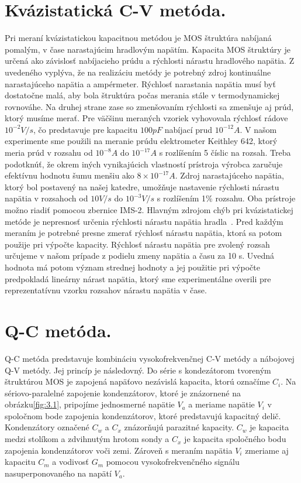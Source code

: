 \section{Kvázistatická C-V metóda.}\label{sec:3.2}

Pri meraní kvázistatickou kapacitnou metódou je MOS štruktúra nabíjaná
pomalým, v čase narastajúcim hradlovým napätím. Kapacita MOS štruktúry
je určená ako závislosť nabíjacieho prúdu a rýchlosti nárastu
hradlového napätia.  Z uvedeného vyplýva, že na realizáciu metódy je
potrebný zdroj kontinuálne narastajúceho napätia a
ampérmeter. Rýchlosť narastania napätia musí byť dostatočne malá, aby
bola štruktúra počas merania stále v termodynamickej rovnováhe. Na
druhej strane zase so zmenšovaním rýchlosti sa zmenšuje aj prúd, ktorý
musíme merať. Pre väčšinu meraných vzoriek vyhovovala rýchlosť rádove
$10^{-2}V/s$, čo predstavuje pre kapacitu $100pF$ nabíjací prud
$10^{-12}A$. V našom experimente sme použili na meranie prúdu
elektrometer Keithley 642, ktorý meria prúd v rozsahu od $10^{-8}A$ do
$10^{-17}A$ s rozlíšením 5 číslic na rozsah.  Treba podotknúť, že
okrem iných vynikajúcich vlastností prístroja výrobca zaručuje
efektívnu hodnotu šumu menšiu ako $8\times10^{-17}A$. Zdroj
narastajúceho napätia, ktorý bol postavený na našej katedre, umožňuje
nastavenie rýchlosti nárastu napätia v rozsahoch od $10V/s$ do
$10^{-3}V/s$ s rozlíšením 1\% rozsahu. Oba prístroje možno riadiť
pomocou zbernice IMS-2.  Hlavným zdrojom chýb pri kvázistatickej
metóde je nepresnosť určenia rýchlosti nárastu napätia
hradla~\cite{1.5}. Pred každým meraním je potrebné presne zmerať
rýchlosť nárastu napätia, ktorá sa potom použije pri výpočte
kapacity. Rýchlosť nárastu napätia pre zvolený rozsah určujeme v našom
prípade z podielu zmeny napätia a času za 10 s.  Uvedná hodnota má
potom význam strednej hodnoty a jej použitie pri výpočte predpokladá
lineárny nárast napätia, ktorý sme experimentálne overili pre
reprezentatívnu vzorku rozsahov nárastu napätia v čase.

\section{Q-C metóda.}\label{sec:3.3}

Q-C metóda\cite{3.4} predstavuje kombináciu vysokofrekvenčnej C-V
metódy a nábojovej Q-V metódy\cite{3.5}. Jej princíp je následovný. Do
série s kondezátorom tvoreným štruktúrou MOS je zapojená napäťovo
nezávislá kapacita, ktorú označíme $C_i$. Na sériovo-paralelné
zapojenie kondenzátorov, ktoré je znázornené na obrázku\ref{fig:3.1},
pripojíme jednosmerné napätie $V_a$ a meriame napätie $V_i$ v
spoločnom bode zapojenia kondenzátorov, ktoré predstavujú kapacitný
delič. Kondenzátory označené $C_w$ a $C_x$ znázorňujú parazitné
kapacity. $C_w$ je kapacita medzi stolíkom a zdvihnutým hrotom sondy a
$C_x$ je kapacita spoločného bodu zapojenia kondenzátorov voči
zemi. Zároveň s meraním napätia $V_i$ zmeriame aj kapacitu $C_m$ a
vodivosť $G_m$ pomocou vysokofrekvenčného signálu nasuperponovaného na
napätí $V_a$.

